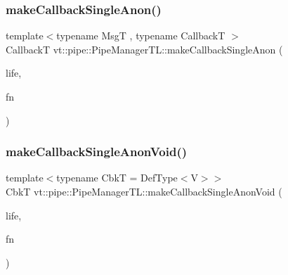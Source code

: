 \mbox{\label{structvt_1_1pipe_1_1_pipe_manager_t_l_a1b3d31ba2e73d77ef2ed5c7f752d2eb9}} 
\subsubsection{\texorpdfstring{make\+Callback\+Single\+Anon()}{makeCallbackSingleAnon()}\hspace{0.1cm}{\footnotesize\ttfamily [6/6]}}
{\footnotesize\ttfamily template$<$typename MsgT , typename CallbackT $>$ \\
CallbackT vt\+::pipe\+::\+Pipe\+Manager\+T\+L\+::make\+Callback\+Single\+Anon (\begin{DoxyParamCaption}\item[{\hyperlink{namespacevt_1_1pipe_acb42b284378c0fdac1d7c6335dc26f58}{Lifetime\+Enum}}]{life,  }\item[{\hyperlink{structvt_1_1pipe_1_1_pipe_manager_base_aa54eee64ab32a27777a672d49eb861f4}{Func\+Msg\+Type}$<$ MsgT $>$}]{fn }\end{DoxyParamCaption})}

\mbox{\label{structvt_1_1pipe_1_1_pipe_manager_t_l_ae239877cc157e7f5c95aa96421b7e1bb}} 
\subsubsection{\texorpdfstring{make\+Callback\+Single\+Anon\+Void()}{makeCallbackSingleAnonVoid()}\hspace{0.1cm}{\footnotesize\ttfamily [1/2]}}
{\footnotesize\ttfamily template$<$typename CbkT  = Def\+Type$<$\+V$>$$>$ \\
CbkT vt\+::pipe\+::\+Pipe\+Manager\+T\+L\+::make\+Callback\+Single\+Anon\+Void (\begin{DoxyParamCaption}\item[{\hyperlink{namespacevt_1_1pipe_acb42b284378c0fdac1d7c6335dc26f58}{Lifetime\+Enum}}]{life,  }\item[{\hyperlink{structvt_1_1pipe_1_1_pipe_manager_base_acd6f0c71f38f08d53f85e83b65406d77}{Func\+Void\+Type}}]{fn }\end{DoxyParamCaption})}

